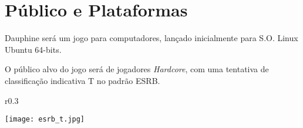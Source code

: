 \AddToShipoutPicture{\BackgroundPic}

\section*{Público e Plataformas}

Dauphine será um jogo para computadores, lançado inicialmente para S.O. Linux Ubuntu 64-bits.

O público alvo do jogo será de jogadores \emph{Hardcore}, com uma tentativa de classificação indicativa T no padrão ESRB.

	\begin{wrapfigure}{r}{0.3\textwidth}

		\raggedright
		\texttt{[image: esrb\_t.jpg]}

	\end{wrapfigure}

